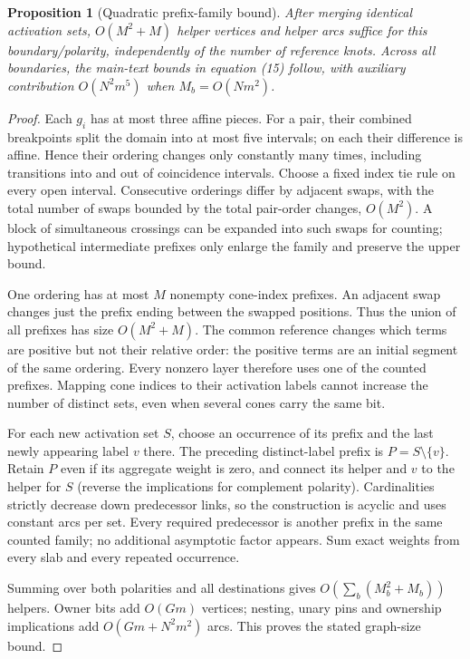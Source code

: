 \documentclass[10pt,letterpaper]{article}
\newtheorem{proposition}[theorem]{Proposition}
\begin{document}
\begin{proposition}[Quadratic prefix-family bound]
After merging identical activation sets, $O(M^2+M)$ helper vertices and helper arcs suffice for this boundary/polarity, independently of the number of reference knots. Across all boundaries, the main-text bounds in equation (15) follow, with auxiliary contribution $O(N^2m^5)$ when $M_b=O(Nm^2)$.
\end{proposition}
\begin{proof}
Each $g_i$ has at most three affine pieces. For a pair, their combined breakpoints split the domain into at most five intervals; on each their difference is affine. Hence their ordering changes only constantly many times, including transitions into and out of coincidence intervals. Choose a fixed index tie rule on every open interval. Consecutive orderings differ by adjacent swaps, with the total number of swaps bounded by the total pair-order changes, $O(M^2)$. A block of simultaneous crossings can be expanded into such swaps for counting; hypothetical intermediate prefixes only enlarge the family and preserve the upper bound.

One ordering has at most $M$ nonempty cone-index prefixes. An adjacent swap changes just the prefix ending between the swapped positions. Thus the union of all prefixes has size $O(M^2+M)$. The common reference changes which terms are positive but not their relative order: the positive terms are an initial segment of the same ordering. Every nonzero layer therefore uses one of the counted prefixes. Mapping cone indices to their activation labels cannot increase the number of distinct sets, even when several cones carry the same bit.

For each new activation set $S$, choose an occurrence of its prefix and the last newly appearing label $v$ there. The preceding distinct-label prefix is $P=S\setminus\{v\}$. Retain $P$ even if its aggregate weight is zero, and connect its helper and $v$ to the helper for $S$ (reverse the implications for complement polarity). Cardinalities strictly decrease down predecessor links, so the construction is acyclic and uses constant arcs per set. Every required predecessor is another prefix in the same counted family; no additional asymptotic factor appears. Sum exact weights from every slab and every repeated occurrence.

Summing over both polarities and all destinations gives $O(\sum_b(M_b^2+M_b))$ helpers. Owner bits add $O(Gm)$ vertices; nesting, unary pins and ownership implications add $O(Gm+N^2m^2)$ arcs. This proves the stated graph-size bound.
\end{proof}
\end{document}
